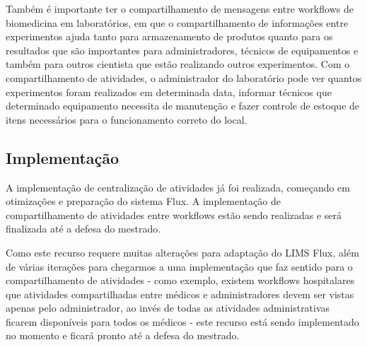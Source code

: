 Também é importante ter o compartilhamento de mensagens entre workflows de biomedicina em laboratórios, em que o compartilhamento de informações entre experimentos ajuda tanto para armazenamento de produtos quanto para os resultados que são importantes para administradores, técnicos de equipamentos e também para outros cientista que estão realizando outros experimentos. Com o compartilhamento de atividades, o administrador do laboratório pode ver quantos experimentos foram realizados em determinada data, informar técnicos que determinado equipamento necessita de manutenção e fazer controle de estoque de itens necessários para o funcionamento correto do local.

\subsection{Implementação}

A implementação de centralização de atividades já foi realizada, começando em otimizações e preparação do sistema Flux. A implementação de compartilhamento de atividades entre workflows estão sendo realizadas e será finalizada até a defesa do mestrado.

Como este recurso requere muitas alterações para adaptação do LIMS Flux, além de várias iterações para chegarmos a uma implementação que faz sentido para o compartilhamento de atividades - como exemplo, existem workflows hospitalares que atividades compartilhadas entre médicos e administradores devem ser vistas apenas pelo administrador, ao invés de todas as atividades administrativas ficarem disponíveis para todos os médicos - este recurso está sendo implementado no momento e ficará pronto até a defesa do mestrado.